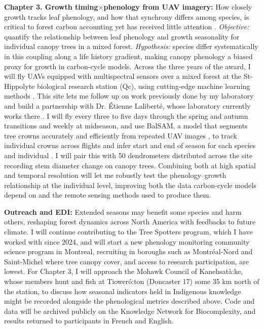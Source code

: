 \documentclass[12pt]{article}
\begin{document}
\textbf{Chapter 3. Growth timing$\times$phenology from UAV imagery:}
How closely growth tracks leaf phenology, and how that synchrony differs among species, is critical to forest carbon accounting yet has received little attention \cite{klein_coordination_2016,kramer_importance_2000}. \textit{Objective:} quantify the relationship between leaf phenology and growth seasonality for individual canopy trees in a mixed forest. \textit{Hypothesis:} species differ systematically in this coupling along a life history gradient, making canopy phenology a biased proxy for growth in carbon-cycle models. Across the three years of the award, I will fly UAVs equipped with multispectral sensors over a mixed forest at the St-Hippolyte biological research station (Qc), using cutting-edge machine learning methods \cite{ball_accurate_2023,ulku_deep_2022}. This site lets me follow up on work previously done by my laboratory \cite{flynn_temperature_2018} and build a partnership with Dr. Étienne Laliberté, whose laboratory currently works there \cite{cloutier_influence_2024}. I will fly every three to five days through the spring and autumn transitions and weekly at midseason, and use BalSAM, a model that segments tree crowns accurately and efficiently from repeated UAV images \cite{teng_bringing_2025}, to track individual crowns across flights and infer start and end of season for each species and individual \cite{berra_assessing_2019,fawcett_monitoring_2021}. I will pair this with 50 dendrometers distributed across the site recording stem diameter change on canopy trees. Combining both at high spatial and temporal resolution will let me robustly test the phenology--growth relationship at the individual level, improving both the data carbon-cycle models depend on \cite{richardson_climate_2013,swidrak_comparing_2013} and the remote sensing methods used to produce them.

\textbf{Outreach and EDI:}
Extended seasons may benefit some species and harm others, reshaping forest dynamics across North America with feedbacks to future climate. I will continue contributing to the Tree Spotters program, which I have worked with since 2024, and will start a new phenology monitoring community science program in Montreal, recruiting in boroughs such as Montréal-Nord and Saint-Michel where tree canopy cover, and access to research participation, are lowest. For Chapter 3, I will approach the Mohawk Council of Kanehsatà:ke, whose members hunt and fish at Tioweró:ton (Doncaster 17) some 35 km north of the station, to discuss how seasonal indicators held in Indigenous knowledge might be recorded alongside the phenological metrics described above. Code and data will be archived publicly on the Knowledge Network for Biocomplexity, and results returned to participants in French and English.

\newpage


\end{document}
